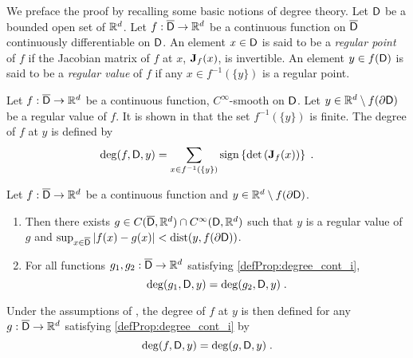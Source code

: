 We preface the proof by recalling some basic notions of degree theory.
\label{sec:defin-usef-results}
Let $\mathsf{D}$ be a bounded open set of $\mathbb{R}^d$. Let $f:
\overline{\mathsf{D}} \to \mathbb{R}^d$ be a continuous function on
$\overline{\mathsf{D}}$ continuously differentiable on $\mathsf{D}$. An element $x \in
\mathsf{D}$ is said to be a \emph{regular point} of $f$ if the Jacobian matrix of $f$ at $x$, $\mathbf{J}_f(x)$, is invertible.
An element $y \in f(\mathsf{D})$ is said to be a \emph{regular value} of $f$ if any $x \in
f^{-1}(\{ y\})$ is a regular point.  %

Let $f : \overline{\mathsf{D}} \to \mathbb{R}^d$ be a continuous function,  $C^{\infty}$-smooth on $\mathsf{D}$. Let $y \in \mathbb{R}^d
  \setminus f(\partial \mathsf{D})$ be a regular value of $f$. It is shown in \cite[Proposition and Definition 1.1]{outerelo:ruiz:2009} that the set $f^{-1}(\{y\})$ is finite. The degree of $f$ at $y$ is defined by
\begin{equation}
  \deg(f,\mathsf{D},y) = \sum_{x \in f^{-1}(\{y \})} \operatorname{sign}\left\lbrace \operatorname{det} \left(\mathbf{J}_f(x) \right) \right\rbrace \;.
\end{equation}

\begin{proposition}
\label{defProp:degree_cont}
  Let $f : \overline{\mathsf{D}} \to \mathbb{R}^d$ be a continuous function and $y \in
  \mathbb{R}^d \setminus f(\partial \mathsf{D})$.
  \begin{enumerate}[label=(\alph*)]
  \item
\label{defProp:degree_cont_i}
 Then there exists  $g \in C(\overline{\mathsf{D}}, \mathbb{R}^d) \cap C^{\infty}(\mathsf{D}, \mathbb{R}^d)$ such that $y$ is a regular value of $g$
  and $\sup_{x \in \overline{\mathsf{D}}} \left\vert f(x)-g(x) \right\vert < \operatorname{dist}(y,f(\partial
  \mathsf{D}))$.
\item For all functions $g_1,g_2:\overline{\mathsf{D}} \to \mathbb{R}^d$ satisfying \ref{defProp:degree_cont_i},
  \begin{equation}
    \deg(g_1,\mathsf{D},y) = \deg(g_2,\mathsf{D},y) \;.
  \end{equation}
  \end{enumerate}
\end{proposition}
Under the assumptions of , the degree of $f$ at $y$ is then defined for any $g:\overline{\mathsf{D}} \to \mathbb{R}^d$ satisfying \ref{defProp:degree_cont_i} by
\begin{equation}
  \deg(f,\mathsf{D},y) =  \deg(g,\mathsf{D},y) \;.
\end{equation}


